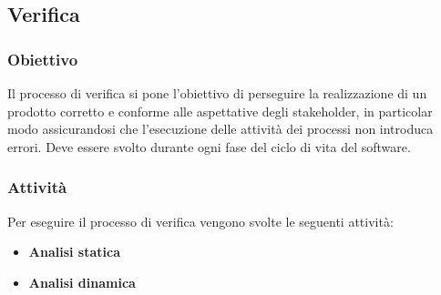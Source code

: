 \subsection{Verifica}
\subsubsection{Obiettivo}
Il processo di verifica si pone l’obiettivo di perseguire la realizzazione di un prodotto corretto e conforme alle aspettative degli stakeholder, in particolar modo assicurandosi che l'esecuzione delle attività dei processi non introduca errori.
Deve essere svolto durante ogni fase del ciclo di vita del software.

\subsubsection{Attività}
Per eseguire il processo di verifica vengono svolte le seguenti attività:
\begin{itemize} 
\item \textbf{Analisi statica}
\item \textbf{Analisi dinamica}
\end{itemize}

